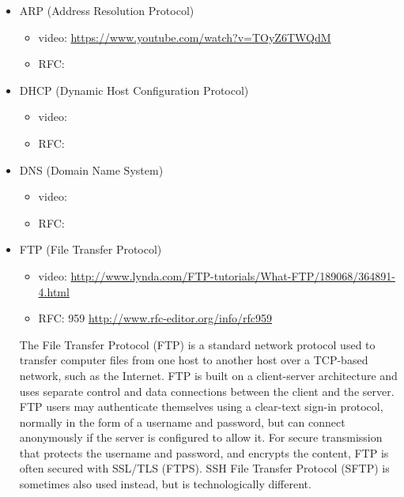\documentclass[dvipdfm]{book}
\begin{document}
\begin{itemize}

\item{ARP (Address Resolution Protocol)}
\begin{itemize}
\item video:
\url{https://www.youtube.com/watch?v=TOyZ6TWQdM}
\item RFC:
\end{itemize}

\item{DHCP (Dynamic Host Configuration Protocol)}
\begin{itemize}
\item video:
\item RFC:
\end{itemize}

\item{DNS (Domain Name System)}
\begin{itemize}
\item video:
\item RFC:
\end{itemize}

\item{FTP (File Transfer Protocol)}
\begin{itemize}
\item video:
\url{http://www.lynda.com/FTP-tutorials/What-FTP/189068/364891-4.html}
\item RFC: 959
\url{http://www.rfc-editor.org/info/rfc959}
\end{itemize}

The File Transfer Protocol (FTP) is a standard network protocol used
to transfer computer files from one host to another host over a
TCP-based network, such as the Internet.\cite{10} FTP is built on a
client-server architecture and uses separate control and data
connections between the client and the server. FTP users may
authenticate themselves using a clear-text sign-in protocol, normally
in the form of a username and password, but can connect anonymously if
the server is configured to allow it. For secure transmission that
protects the username and password, and encrypts the content, FTP is
often secured with SSL/TLS (FTPS). SSH File Transfer Protocol (SFTP)
is sometimes also used instead, but is technologically different.


\end{itemize}
\end{document}
